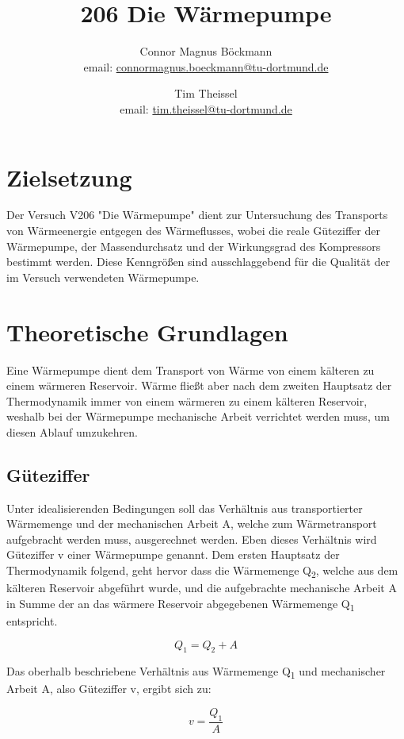 \documentclass[titlepage=firstcover, captions=tableheading]{scrartcl}
\title{206 Die Wärmepumpe}
\author{
Connor Magnus Böckmann \\ email: \href{mailto:connormagnus.boeckmann@tu-dortmund.de}{connormagnus.boeckmann@tu-dortmund.de}
\and Tim Theissel \\ email: \href{mailto:tim.theissel@tu-dortmund.de}{tim.theissel@tu-dortmund.de}  
}
\begin{document}
\maketitle
\newpage
\tableofcontents
\newpage
\section{Zielsetzung}
Der Versuch V206 "Die Wärmepumpe" dient zur Untersuchung des Transports von Wärmeenergie entgegen des Wärmeflusses, 
wobei die reale Güteziffer der Wärmepumpe, der Massendurchsatz und der Wirkungsgrad des Kompressors bestimmt werden. 
Diese Kenngrößen sind ausschlaggebend für die Qualität der im Versuch verwendeten Wärmepumpe. 

\section{Theoretische Grundlagen} 

Eine Wärmepumpe dient dem Transport von Wärme von einem kälteren zu einem wärmeren Reservoir. 
Wärme fließt aber nach dem zweiten Hauptsatz der Thermodynamik immer von einem wärmeren zu einem kälteren Reservoir, 
weshalb bei der Wärmepumpe mechanische Arbeit verrichtet werden muss, um diesen Ablauf umzukehren. 
\subsection{Güteziffer}
Unter idealisierenden Bedingungen soll das Verhältnis aus transportierter Wärmemenge und der mechanischen Arbeit A, 
welche zum Wärmetransport aufgebracht werden muss, ausgerechnet werden. 
Eben dieses Verhältnis wird Güteziffer v einer Wärmepumpe genannt. 
Dem ersten Hauptsatz der Thermodynamik folgend, geht hervor dass die Wärmemenge Q\textsubscript{2},
welche aus dem kälteren Reservoir abgeführt wurde,
und die aufgebrachte mechanische Arbeit A in Summe der an das wärmere Reservoir abgegebenen Wärmemenge Q\textsubscript{1} entspricht.

\begin{equation}\label{1}
    Q_1= Q_2+A 
\end{equation}

\noindent Das oberhalb beschriebene Verhältnis aus Wärmemenge Q\textsubscript{1} und mechanischer Arbeit A, also Güteziffer v, ergibt sich zu: 

\begin{displaymath}
    v = \frac{Q_1}{A}
\end{displaymath}
\end{document}
